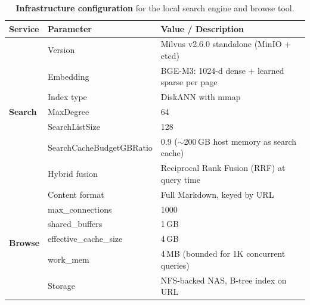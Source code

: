 \documentclass{article} %
\theoremstyle{plain}
\theoremstyle{definition}
\theoremstyle{remark}
\begin{document}
\begin{table}[H]
    \centering
    \footnotesize
    \setlength{\tabcolsep}{3pt}
    \renewcommand{\arraystretch}{1.15}

    \begin{tabularx}{\textwidth}{@{} l l X @{}}
        \toprule
        \textbf{Service} & \textbf{Parameter} & \textbf{Value / Description} \\
        \midrule
        \multirow{7}{*}{\textbf{Search}}
        & Version & Milvus v2.6.0 standalone (MinIO + etcd) \\
        & Embedding & BGE-M3: 1024-d dense + learned sparse per page \\
        & Index type & DiskANN with mmap \\
        & MaxDegree & 64 \\
        & SearchListSize & 128 \\
        & SearchCache\-BudgetGBRatio & 0.9 ($\sim$200\,GB host memory as search cache) \\
        & Hybrid fusion & Reciprocal Rank Fusion (RRF) at query time \\
        \midrule
        \multirow{6}{*}{\textbf{Browse}}
        & Content format & Full Markdown, keyed by URL \\
        & max\_connections & 1000 \\
        & shared\_buffers & 1\,GB \\
        & effective\_cache\_size & 4\,GB \\
        & work\_mem & 4\,MB (bounded for 1K concurrent queries) \\
        & Storage & NFS-backed NAS, B-tree index on URL \\
        \bottomrule
    \end{tabularx}
    \caption{\textbf{Infrastructure configuration} for the local search engine and browse tool.}
    \label{tab:infra_config}
\end{table}
\end{document}
